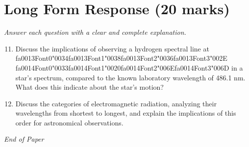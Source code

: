 \documentclass[12pt]{article}
\begin{document}
\section*{Long Form Response (20 marks)}
\textit{Answer each question with a clear and complete explanation.}
\begin{enumerate}[label=\arabic*.]
\setcounter{enumi}{10}
\item Discuss the implications of observing a hydrogen spectral line at {\csname fa0013Font0\endcsname\char"0034}{\csname fa0013Font1\endcsname\char"0038}{\csname fa0013Font2\endcsname\char"0036}{\csname fa0013Font3\endcsname\char"002E} {\csname fa0014Font0\endcsname\char"0033}{\csname fa0014Font1\endcsname\char"0020}{\csname fa0014Font2\endcsname\char"006E}{\csname fa0014Font3\endcsname\char"006D} in a star's
spectrum, compared to the known laboratory wavelength of 486.1 nm. What does this indicate
about the star's motion?
\item Discuss the categories of electromagnetic radiation, analyzing their wavelengths from
shortest to longest, and explain the implications of this order for astronomical
observations.
\end{enumerate}

\vfill
\noindent\textit{End of Paper}
\end{document}
